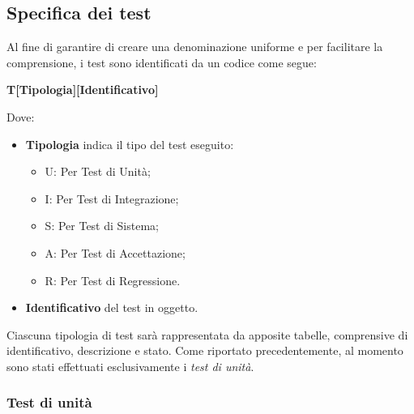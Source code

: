 \subsection{Specifica dei test}
Al fine di garantire di creare una denominazione uniforme e per facilitare la comprensione, i test sono identificati da un codice come segue:
\begin{center}
    \textbf{T[Tipologia][Identificativo]}
\end{center}
Dove:
\begin{itemize}
    \item \textbf{Tipologia} indica il tipo del test eseguito:
    \begin{itemize}
        \item U: Per Test di Unità;
        \item I: Per Test di Integrazione;
        \item S: Per Test di Sistema;
        \item A: Per Test di Accettazione;
        \item R: Per Test di Regressione.
    \end{itemize}
    \item \textbf{Identificativo} del test in oggetto.
\end{itemize}
Ciascuna tipologia di test sarà rappresentata da apposite tabelle, comprensive di identificativo, descrizione e stato. Come riportato precedentemente, al momento sono stati effettuati esclusivamente i \textit{test di unità}.

\subsubsection{Test di unità}

